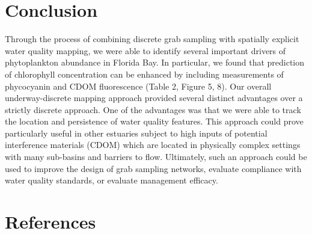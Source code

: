 \documentclass[review]{elsarticle}
\begin{document}
\section{Conclusion}

Through the process of combining discrete grab sampling with spatially explicit water quality mapping, we were able to identify several important drivers of phytoplankton abundance in Florida Bay. In particular, we found that prediction of chlorophyll concentration can be enhanced by including measurements of phycocyanin and CDOM fluorescence (Table 2, Figure 5, 8). Our overall underway-discrete mapping approach provided several distinct advantages over a strictly discrete approach. One of the advantages was that we were able to track the location and persistence of water quality features. This approach could prove particularly useful in other estuaries subject to high inputs of potential interference materials (CDOM) which are located in physically complex settings with many sub-basins and barriers to flow. Ultimately, such an approach could be used to improve the design of grab sampling networks, evaluate compliance with water quality standards, or evaluate management efficacy.

\section*{References}


\end{document}

